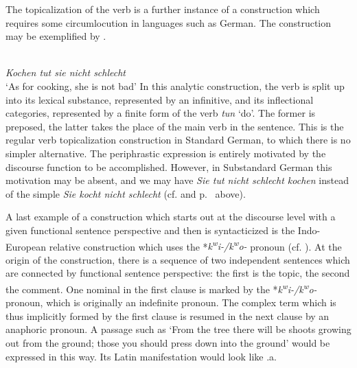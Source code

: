 The topicalization of the verb is a further instance of a construction which requires some circumlocution in languages such as German. The construction may be exemplified by .

\ea \label{ex:E95}
\langinfo{\LangGerm}\\
{\itshape Kochen tut sie nicht schlecht}\\
\glt ‘As for cooking, she is not bad’
\z
\noindent In this analytic construction, the verb is split up into its lexical substance, represented by an infinitive, and its inflectional categories, represented by a finite form of the verb \textit{tun} ‘do’. The former is preposed, the latter takes the place of the main verb in the sentence. This is the regular verb topicalization construction in Standard German, to which there is no simpler alternative. The periphrastic expression is entirely motivated by the discourse function to be accomplished.\label{page123} However, in Substandard German this motivation may be absent, and we may have \textit{Sie tut nicht schlecht kochen} instead of the simple \textit{Sie kocht nicht schlecht} (cf. \citealt[156]{Ronneberger-Sibold1980} and p.~\pageref{page35}\chk%
  above).

A last example of a construction which starts out at the discourse level with a given functional sentence perspective and then is syntacticized is the Indo-European relative construction which uses the *\textit{k}\textit{\textsuperscript{w}}\textit{i-/k}\textit{\textsuperscript{w}}\textit{o-} pronoun (cf. \citealt[Ch. \textsc{vi}.1]{Lehmann1984}). At the origin of the construction, there is a sequence of two independent sentences which are connected by functional sentence perspective: the first is the topic, the second the comment. One nominal in the first clause is marked by the *\textit{k}\textit{\textsuperscript{w}}\textit{i-/k}\textit{\textsuperscript{w}}\textit{o-} pronoun, which is originally an indefinite pronoun. The complex term which is thus implicitly formed by the first clause  is resumed in the next clause by an anaphoric pronoun. A passage such as ‘From the tree there will be shoots growing out from the ground; those you should press down into the ground’ would be expressed in this way. Its Latin manifestation would look like .a.

